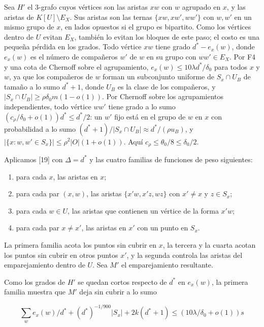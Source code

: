 \documentclass[spanish,11pt,a4paper]{article}
\providecommand{\tightlist}{\setlength{\itemsep}{0pt}\setlength{\parskip}{0pt}}
\begin{document}
Sea \(H'\) el 3-grafo cuyos vértices son las aristas \(xw\) con \(w\) agrupado en \(x\), y las aristas de \(K[U]\setminus E_X\). Sus aristas son las ternas \(\{xw,xw',ww'\}\) con \(w,w'\) en un mismo grupo de \(x\), en lados opuestos si el grupo es bipartito. Como los vértices dentro de \(U\) evitan \(E_X\), también lo evitan los bloques de este paso; el costo es una pequeña pérdida en los grados. Todo vértice \(xw\) tiene grado \(d^*-e_x(w)\), donde \(e_x(w)\) es el número de compañeros \(w'\) de \(w\) en su grupo con \(ww'\in E_X\). Por F4 y una cota de Chernoff sobre el agrupamiento, \(e_x(w)\le10\lambda d^*/\delta_0\) para todos \(x\) y \(w\), ya que los compañeros de \(w\) forman un subconjunto uniforme de \(S_x\cap U_B\) de tamaño a lo sumo \(d^*+1\), donde \(U_B\) es la clase de los compañeros, y \(|S_x\cap U_B|\ge\rho\delta_0m(1-o(1))\). Por Chernoff sobre los agrupamientos independientes, todo vértice \(ww'\) tiene grado a lo sumo \((c_\rho/\delta_0+o(1))d^*\le d^*/2\): un \(w'\) fijo está en el grupo de \(w\) en \(x\) con probabilidad a lo sumo \((d^*+1)/|S_x\cap U_B|\approx d^*/(\rho u_B)\), y \(|\{x:w,w'\in S_x\}|\le\rho^2|O|(1+o(1))\). Aquí \(c_\rho\le\theta_0/8\le\delta_0/2\).

Aplicamos {[}19{]} con \(\Delta=d^*\) y las cuatro familias de funciones de peso siguientes:

\begin{enumerate}
\def\labelenumi{\arabic{enumi}.}
\tightlist
\item
  para cada \(x\), las aristas en \(x\);
\item
  para cada par \((x,w)\), las aristas \(\{x'w,x'z,wz\}\) con \(x'\ne x\) y \(z\in S_x\);
\item
  para cada \(w\in U\), las aristas que contienen un vértice de la forma \(x'w\);
\item
  para cada par \(x\ne x'\), las aristas en \(x'\) con un punto en \(S_x\).
\end{enumerate}

La primera familia acota los puntos sin cubrir en \(x\), la tercera y la cuarta acotan los puntos sin cubrir en otros puntos \(x'\), y la segunda controla las aristas del emparejamiento dentro de \(U\). Sea \(M'\) el emparejamiento resultante.

Como los grados de \(H'\) se quedan cortos respecto de \(d^*\) en \(e_x(w)\), la primera familia muestra que \(M'\) deja sin cubrir a lo sumo

\nopagebreak[4]
\[\sum_w e_x(w)/d^*+(d^*)^{-1/900}|S_x|+2k(d^*+1)\le(10\lambda/\delta_0+o(1))s\]
\end{document}
